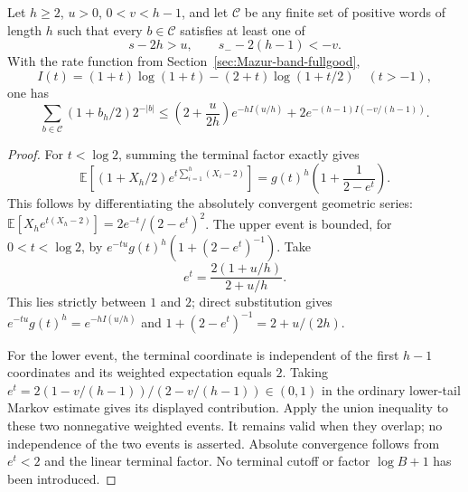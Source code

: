 \begin{proposition}
\label{prop:Mazur-weighted-chernoff}
Let $h\ge2$, $u>0$, $0<v<h-1$, and let $\mathcal C$ be any
finite set of positive words of length $h$ such that every $b\in\mathcal C$
satisfies at least one of
\[
 s-2h>u,\qquad s_--2(h-1)<-v .
\]
With the rate function from Section~\ref{sec:Mazur-band-fullgood},
\[
 I(t)=(1+t)\log(1+t)-(2+t)\log(1+t/2)\quad(t>-1),
\]
one has
\begin{equation}
 \sum_{b\in\mathcal C}(1+b_h/2)2^{-|b|}
 \le \left(2+\frac{u}{2h}\right)e^{-hI(u/h)}
       +2e^{-(h-1)I(-v/(h-1))}.
 \label{eq:Mazur-weighted-chernoff}
\end{equation}
\end{proposition}
\begin{proof}
For $t<\log2$, summing the terminal factor exactly gives
\[
 \mathbb E[(1+X_h/2)e^{t\sum_{i=1}^h(X_i-2)}]
 =g(t)^h\left(1+\frac1{2-e^t}\right).
\]
This follows by differentiating the absolutely convergent geometric
series: $\mathbb E[X_he^{t(X_h-2)}]=2e^{-t}/(2-e^t)^2$.
The upper event is bounded, for $0<t<\log2$, by
$e^{-tu}g(t)^h(1+(2-e^t)^{-1})$.
Take
\[
 e^t=\frac{2(1+u/h)}{2+u/h}.
\]
This lies strictly between $1$ and $2$; direct substitution gives
$e^{-tu}g(t)^h=e^{-hI(u/h)}$ and
$1+(2-e^t)^{-1}=2+u/(2h)$.

For the lower event, the terminal coordinate is independent of the
first $h-1$ coordinates and its weighted expectation equals $2$.
Taking $e^t=2(1-v/(h-1))/(2-v/(h-1))\in(0,1)$ in the ordinary
lower-tail Markov estimate gives its displayed contribution.
Apply the union inequality to these two nonnegative weighted events.
It remains valid when they overlap; no independence of the two events
is asserted. Absolute convergence follows from $e^t<2$ and the
linear terminal factor. No terminal cutoff or factor $\log B+1$
has been introduced.
\end{proof}

